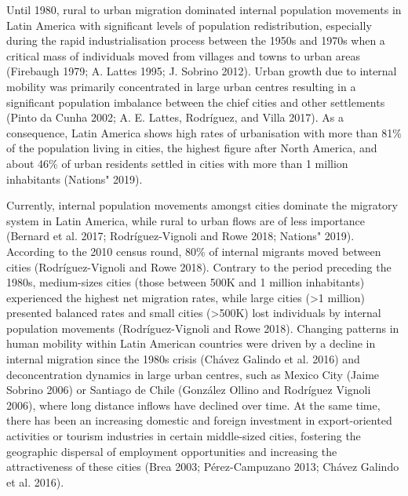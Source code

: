 \documentclass[11pt,letterpaper]{article}
\begin{document}
Until 1980, rural to urban migration dominated internal population
movements in Latin America with significant levels of population
redistribution, especially during the rapid industrialisation process
between the 1950s and 1970s when a critical mass of individuals moved
from villages and towns to urban areas (Firebaugh 1979; A. Lattes 1995;
J. Sobrino 2012). Urban growth due to internal mobility was primarily
concentrated in large urban centres resulting in a significant
population imbalance between the chief cities and other settlements
(Pinto da Cunha 2002; A. E. Lattes, Rodríguez, and Villa 2017). As a
consequence, Latin America shows high rates of urbanisation with more
than 81\% of the population living in cities, the highest figure after
North America, and about 46\% of urban residents settled in cities with
more than 1 million inhabitants (Nations" 2019).

Currently, internal population movements amongst cities dominate the
migratory system in Latin America, while rural to urban flows are of
less importance (Bernard et al. 2017; Rodríguez-Vignoli and Rowe 2018;
Nations" 2019). According to the 2010 census round, 80\% of internal
migrants moved between cities (Rodríguez-Vignoli and Rowe 2018).
Contrary to the period preceding the 1980s, medium-sizes cities (those
between 500K and 1 million inhabitants) experienced the highest net
migration rates, while large cities (\textgreater1 million) presented
balanced rates and small cities (\textgreater500K) lost individuals by
internal population movements (Rodríguez-Vignoli and Rowe 2018).
Changing patterns in human mobility within Latin American countries were
driven by a decline in internal migration since the 1980s crisis (Chávez
Galindo et al. 2016) and deconcentration dynamics in large urban
centres, such as Mexico City (Jaime Sobrino 2006) or Santiago de Chile
(González Ollino and Rodríguez Vignoli 2006), where long distance
inflows have declined over time. At the same time, there has been an
increasing domestic and foreign investment in export-oriented activities
or tourism industries in certain middle-sized cities, fostering the
geographic dispersal of employment opportunities and increasing the
attractiveness of these cities (Brea 2003; Pérez-Campuzano 2013; Chávez
Galindo et al. 2016).
\end{document}
